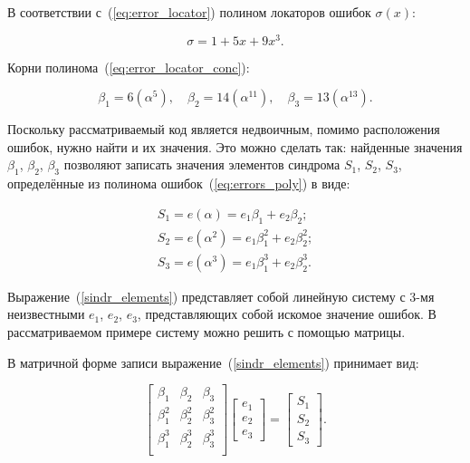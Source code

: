 В соответствии с~(\ref{eq:error_locator}) полином локаторов ошибок
$\sigma(x)$:

\begin{equation}
  \label{eq:error_locator_conc}
  \sigma = 1 + 5x + 9x^3.
\end{equation}

Корни полинома~(\ref{eq:error_locator_conc}):

\begin{equation*}
  \beta_1 = 6(\alpha^5), \quad
  \beta_2 = 14(\alpha^{11}),\quad
  \beta_3 = 13(\alpha^{13}).
\end{equation*}

Поскольку рассматриваемый код является недвоичным, помимо расположения
ошибок, нужно найти и их значения. Это можно сделать так: найденные
значения $\beta_1$, $\beta_2$, $\beta_3$ позволяют записать значения
элементов синдрома $S_1$, $S_2$, $S_3$, определённые из полинома
ошибок~(\ref{eq:errors_poly}) в виде:

\begin{equation}
  \label{sindr_elements}
  \begin{gathered}
    S_1 = e(\alpha) = e_1\beta_1 + e_2\beta_2;\\
    S_2 = e(\alpha^2) = e_1\beta_1^2 + e_2\beta_2^2;\\
    S_3 = e(\alpha^3) = e_1\beta_1^3 + e_2\beta_2^3.
  \end{gathered}
\end{equation}

Выражение~(\ref{sindr_elements}) представляет собой линейную систему с
3-мя неизвестными $e_1$, $e_2$, $e_3$, представляющих собой искомое
значение ошибок. В рассматриваемом примере систему можно решить с
помощью матрицы.

В матричной форме записи выражение~(\ref{sindr_elements}) принимает
вид:

\begin{equation*}
  \begin{bmatrix}
    \beta_1 & \beta_2 & \beta_3 \\
    \beta_1^2 & \beta_2^2 & \beta_3^2 \\
    \beta_1^3 & \beta_2^3 & \beta_3^3 \\
  \end{bmatrix}
  \begin{bmatrix}
    e_1\\
    e_2\\
    e_3
  \end{bmatrix} =
  \begin{bmatrix}
    S_1\\
    S_2\\
    S_3
  \end{bmatrix}.
\end{equation*}

